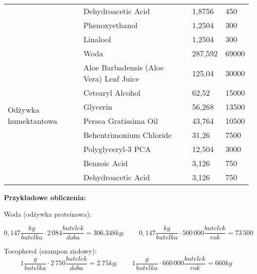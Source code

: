 \begin{table}[h]
\begin{tabular}{llll}
		 & Dehydroacetic Acid & 1,8756 & 450 \\
		 & Phenoxyethanol & 1,2504 & 300 \\
		 & Linalool & 1,2504 & 300 \\
		\hline
		\multirow{9}{*}{Odżywka humektantowa} & Woda & 287,592 & 69000 \\
		 & Aloe Barbadensis (Aloe Vera) Leaf Juice & 125,04  & 30000 \\
		 & Cetearyl Alcohol & 62,52 & 15000 \\
		 & Glycerin & 56,268 & 13500 \\
		 & Persea Gratissima Oil & 43,764 & 10500 \\
		 & Behentrimonium Chloride & 31,26 & 7500 \\
		 & Polyglyceryl-3 PCA & 12,504 & 3000 \\
		 & Benzoic Acid & 3,126 & 750 \\
		 & Dehydroacetic Acid & 3,126 & 750 \\
		 \hline
	\end{tabular}
\end{table}

\textbf{Przykładowe obliczenia:}

Woda (odżywka proteinowa):

\begin{equation}
	0,147 \frac{kg}{butelka} \cdot 2\,084 \frac{butelek}{doba} = 306.348kg; \qquad
	0,147 \frac{kg}{butelka} \cdot 500\,000 \frac{butelek}{rok} = 73\,500
\end{equation}

Tocopherol (szampon ziołowy):
\begin{equation}
	1 \frac{g}{butelka} \cdot 2\,750 \frac{butelek}{doba} = 2.75 kg; \qquad
	1 \frac{g}{butelka} \cdot 660\,000 \frac{butelek}{rok} = 660kg
\end{equation}

